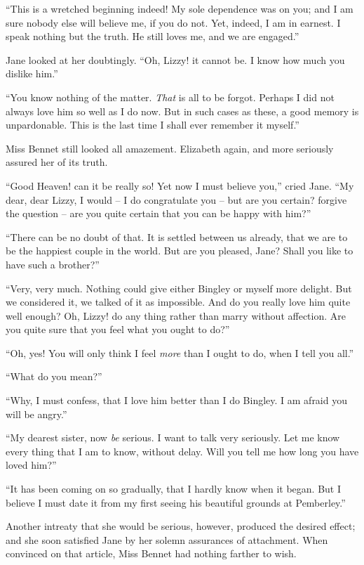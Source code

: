 “This is a wretched beginning indeed! My sole dependence
was on you; and I am sure nobody else will believe
me, if you do not. Yet, indeed, I am in earnest. I speak
nothing but the truth. He still loves me, and we are
engaged.”

Jane looked at her doubtingly. “Oh, Lizzy! it cannot
be. I know how much you dislike him.”

“You know nothing of the matter. \textit{That} is all to be
forgot. Perhaps I did not always love him so well as
I do now. But in such cases as these, a good memory is
unpardonable. This is the last time I shall ever remember
it myself.”

Miss Bennet still looked all amazement. Elizabeth
again, and more seriously assured her of its truth.

“Good Heaven! can it be really so! Yet now I must
believe you,” cried Jane. “My dear, dear Lizzy, I would -- I
do congratulate you -- but are you certain? forgive the
question -- are you quite certain that you can be happy
with him?”

“There can be no doubt of that. It is settled between
us already, that we are to be the happiest couple in the
world. But are you pleased, Jane? Shall you like to have
such a brother?”

“Very, very much. Nothing could give either Bingley
or myself more delight. But we considered it, we talked
of it as impossible. And do you really love him quite well
enough? Oh, Lizzy! do any thing rather than marry
without affection. Are you quite sure that you feel what
you ought to do?”

“Oh, yes! You will only think I feel \textit{more} than I ought
to do, when I tell you all.”

“What do you mean?”

“Why, I must confess, that I love him better than I do
Bingley. I am afraid you will be angry.”

“My dearest sister, now \textit{be} serious. I want to talk
very seriously. Let me know every thing that I am to
know, without delay. Will you tell me how long you have
loved him?”

“It has been coming on so gradually, that I hardly
know when it began. But I believe I must date it from
my first seeing his beautiful grounds at Pemberley.”

Another intreaty that she would be serious, however,
produced the desired effect; and she soon satisfied Jane
by her solemn assurances of attachment. When convinced
on that article, Miss Bennet had nothing farther to wish.


